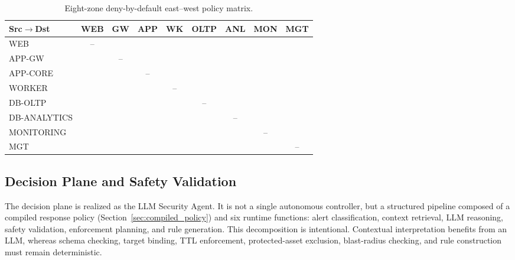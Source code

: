 \documentclass[final,5p]{elsarticle}
\newcommand{\cmark}{\textcolor{ForestGreen}{\ding{51}}}
\newcommand{\xmark}{\textcolor{BrickRed}{\ding{55}}}
\begin{document}
\begin{table}[tbp]
    \centering
    \caption{Eight-zone deny-by-default east--west policy matrix.}
    \label{tab:policy_matrix}
    \scriptsize
    \setlength{\tabcolsep}{0.8pt}
    \renewcommand{\arraystretch}{1.05}
    \begin{tabular}{@{}lcccccccc@{}}
        \toprule
        \textbf{Src$\rightarrow$Dst} & \textbf{WEB} & \textbf{GW} & \textbf{APP} & \textbf{WK} & \textbf{OLTP} & \textbf{ANL} & \textbf{MON} & \textbf{MGT} \\
        \midrule
        WEB          & -- & \cmark & \xmark & \xmark & \xmark & \xmark & \xmark & \xmark \\
        APP-GW       & \xmark & -- & \cmark & \xmark & \xmark & \xmark & \xmark & \xmark \\
        APP-CORE     & \xmark & \xmark & -- & \cmark & \cmark & \cmark & \xmark & \xmark \\
        WORKER       & \xmark & \xmark & \xmark & -- & \cmark & \xmark & \xmark & \xmark \\
        DB-OLTP      & \xmark & \xmark & \xmark & \xmark & -- & \cmark & \xmark & \xmark \\
        DB-ANALYTICS & \xmark & \xmark & \xmark & \xmark & \xmark & -- & \xmark & \xmark \\
        MONITORING   & \cmark & \cmark & \cmark & \cmark & \cmark & \cmark & -- & \xmark \\
        MGT          & \cmark & \cmark & \cmark & \cmark & \cmark & \cmark & \cmark & -- \\
        \bottomrule
    \end{tabular}
\end{table}

\subsection{Decision Plane and Safety Validation}
\label{sec:decision_safety}

The decision plane is realized as the LLM Security Agent. It is not a single autonomous controller, but a structured pipeline composed of a compiled response policy (Section~\ref{sec:compiled_policy}) and six runtime functions: alert classification, context retrieval, LLM reasoning, safety validation, enforcement planning, and rule generation. This decomposition is intentional. Contextual interpretation benefits from an LLM, whereas schema checking, target binding, TTL enforcement, protected-asset exclusion, blast-radius checking, and rule construction must remain deterministic.
\end{document}
